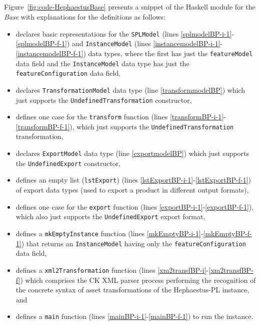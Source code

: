 
\subsection{\hpbase}
\label{sec:hpbase}

Figure~\ref{fig:code-HephaestusBase} presents a snippet of the Haskell module for the \hp{} \emph{Base} with explanations for the definitions as follows:

\begin{itemize}

\item declares basic representations for the \texttt{SPLModel} (lines \ref{splmodelBP-i-1}-\ref{splmodelBP-f-1}) and \texttt{InstanceModel} (lines \ref{instancemodelBP-i-1}-\ref{instancemodelBP-f-1}) data types, where the first has just the \texttt{featureModel} data field and the \texttt{InstanceModel} data type has just the \texttt{featureConfiguration} data field,

\item declares \texttt{TransformationModel} data type (line \ref{transformmodelBP}) which just supports the \texttt{UndefinedTransformation} constructor,

\item defines one case for the \texttt{transform} function (lines \ref{transformBP-i-1}-\ref{transformBP-f-1}), which just supports the \texttt{UndefinedTransformation} transformation,

\item declares \texttt{ExportModel} data type (line \ref{exportmodelBP}) which just supports the \texttt{UndefinedExport} constructor,

\item defines an empty list (\texttt{lstExport}) (lines \ref{lstExportBP-i-1}-\ref{lstExportBP-f-1}) of export data types (used to export a product in different output formats),

\item defines one case for the \texttt{export} function (lines \ref{exportBP-i-1}-\ref{exportBP-f-1}), which also just supports the \texttt{UndefinedExport} export format,

\item defines a \texttt{mkEmptyInstance} function (lines \ref{mkEmptyBP-i-1}-\ref{mkEmptyBP-f-1}) that returns an \texttt{InstanceModel} having only the \texttt{featureConfiguration} data field,

\item defines a \texttt{xml2Transformation} function (lines \ref{xm2transfBP-i}-\ref{xm2transfBP-f}) which comprises the CK XML parser process performing the recognition of the concrete syntax of asset transformations of the Hephaestus-PL instance, and

\item defines a \texttt{main} function (lines \ref{mainBP-i-1}-\ref{mainBP-f-1}) to run the \hp{} instance.

\end{itemize}

